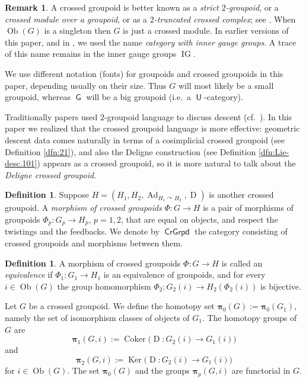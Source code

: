 \documentclass[a4paper, 10pt]{amsart}
\theoremstyle{definition}
\newtheorem{dfn}[equation]{Definition}
\newtheorem{rem}[equation]{Remark}
\numberwithin{equation}{section}
\newcommand{\opn}{\operatorname}
\newcommand{\cat}[1]{\operatorname{\mathsf{#1}}}
\newcommand{\bsym}[1]{\boldsymbol{#1}}
\newcommand{\crvar}{\curvearrowright}
\begin{document}
\begin{rem} \label{rem:cosim.101}
A crossed groupoid is better known as a 
{\em strict $2$-groupoid}, or a {\em crossed module over a groupoid}, or
as a {\em $2$-truncated crossed complex}; see \cite{Bw}. When
$\opn{Ob}(G)$ is a singleton then $G$ is just a crossed module. 
In earlier versions of this paper, and in \cite{Ye10}, we used the name 
{\em category with inner gauge groups}. A trace of this name remains
in the inner gauge groups $\opn{IG}$. 

We use different notation (fonts) for groupoids and crossed groupoids in this
paper, depending usually on their size. Thus $G$ will most likely be a small
groupoid, whereas $\cat{G}$ will be a big groupoid (i.e.\ a
$\cat{U}$-category).  

Traditionally papers used $2$-groupoid language to discuss descent (cf.\
\cite{BGNT1}). In this paper we realized that the crossed groupoid language is
more effective: geometric descent data comes naturally in terms of a
cosimplicial crossed groupoid (see Definition \ref{dfn:21}), and also the
Deligne construction (see Definition \ref{dfn:Lie-desc.101}) appears as a
crossed groupoid, so it is more natural to talk about the
{\em Deligne crossed groupoid}. 
\end{rem}

\begin{dfn}
Suppose 
$H = ( H_1, H_2, \opn{Ad}_{H_1 \crvar H_{2}}, \opn{D} )$ 
is another crossed groupoid. A {\em morphism of crossed groupoids}
$\Phi : G \to H$
is a pair of morphisms of groupoids 
$\Phi_p : G_p \to H_p$, $p = 1, 2$, that are equal on objects, 
and respect the twistings and the feedbacks. We denote by
$\cat{CrGrpd}$ the category consisting of crossed groupoids and morphisms
between them. 
\end{dfn}

\begin{dfn} \label{dfn:227}
A morphism of crossed groupoids $\Phi : G \to H$ is called an
{\em equivalence} if 
$\Phi_1 : G_1 \to H_1$ is an equivalence of groupoids, and for every
$i \in \opn{Ob}(G)$ the group homomorphism 
$\Phi_2 : G_2(i) \to H_2(\Phi_2(i))$ is bijective. 
\end{dfn}

Let $G$ be a crossed groupoid. We define the homotopy set 
$\bsym{\pi}_0(G) := \bsym{\pi}_0(G_1)$,
namely the set of isomorphism classes of objects of $G_1$.
The homotopy groups of $G$ are 
\[ \bsym{\pi}_1(G, i) := 
\opn{Coker} \bigl( \opn{D} : G_2(i) \to G_1(i) \bigr) \]
and
\[ \bsym{\pi}_2(G, i) := 
\opn{Ker} \bigl( \opn{D} : G_2(i) \to G_1(i) \bigr) \]
for $i \in \opn{Ob}(G)$.
The set $\bsym{\pi}_0(G)$ and the groups $\bsym{\pi}_p(G, i)$ are
functorial in $G$. 
\end{document}
